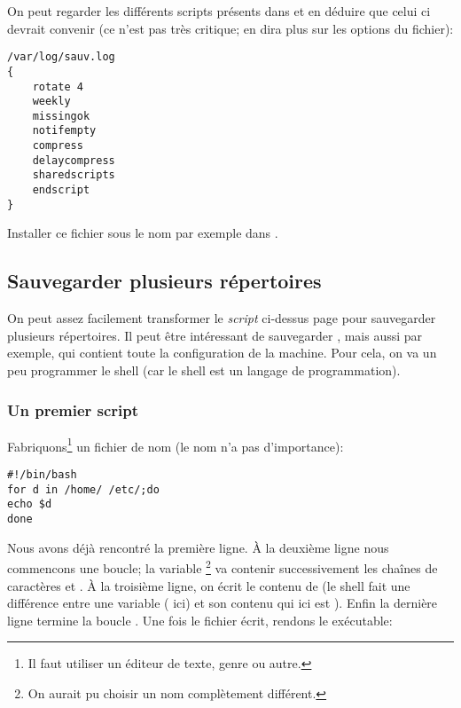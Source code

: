 On peut regarder les différents scripts présents dans
et en déduire que celui ci devrait convenir (ce n'est pas très
critique;  en dira plus sur les options du fichier):
\begin{center}
  \begin{boxedminipage}{0.85\textwidth}
  \begin{verbatim}
/var/log/sauv.log
{
	rotate 4
	weekly
	missingok
	notifempty
	compress
	delaycompress
	sharedscripts
	endscript
}
\end{verbatim}
  \end{boxedminipage}
\end{center}

Installer ce fichier sous le nom  par exemple dans
. 

\subsection{Sauvegarder plusieurs répertoires}
On peut assez facilement transformer le \emph{script} ci-dessus page
\pageref{save1} pour 
sauvegarder plusieurs répertoires. Il peut être intéressant de
sauvegarder , mais aussi  par exemple, qui
contient toute la configuration de la machine. Pour cela, on va un peu
programmer le shell (car le shell est un langage de programmation).

\subsubsection{Un premier script}
Fabriquons\footnote{Il faut utiliser un éditeur de texte, genre
   ou autre.} un fichier de nom  (le nom n'a
pas d'importance):
\begin{center}
\begin{boxedminipage}{0.85\textwidth}
\begin{verbatim}
#!/bin/bash
for d in /home/ /etc/;do
echo $d
done
\end{verbatim}
\end{boxedminipage}
\end{center}
Nous avons déjà rencontré la première ligne. \`A la deuxième ligne nous
commencons une boucle; la variable \footnote{On aurait pu
  choisir un nom complètement différent.} va contenir successivement
les chaînes de caractères  et .  \`A la
troisième ligne, on écrit le contenu de  (le shell fait une
différence entre une variable ( ici) et son contenu qui ici est
). Enfin la dernière ligne termine la boucle .
Une fois le fichier écrit, rendons le exécutable:


